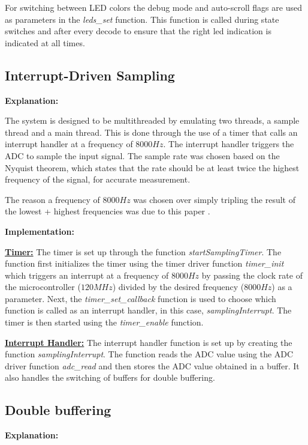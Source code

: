 \documentclass{cce2014-design}
\begin{document}
For switching between LED colors the debug mode and auto-scroll flags are used as parameters in the \textit{leds\_set} function. This function is called during state switches and after every decode to ensure that the right led indication is indicated at all times.

\newpage

\subsection{Interrupt-Driven Sampling}
\textbf{Explanation:}

The system is designed to be multithreaded by emulating two threads, a sample thread and a main thread. This is done through the use of a timer that calls an interrupt handler at a frequency of $8000Hz$. The interrupt handler triggers the ADC to sample the input signal. The sample rate was chosen based on the Nyquist theorem, which states that the rate should be at least twice the highest frequency of the signal, for accurate measurement.

The reason a frequency of $8000Hz$ was chosen over simply tripling the result of the lowest + highest frequencies was due to this paper \cite{DTMF_Frequency_Choice}.

\vspace{1em}
\textbf{Implementation:}

\textbf{\underline{Timer:}} The timer is set up through the function \textit{startSamplingTimer}. The function first initializes the timer using the timer driver function \textit{timer\_init} which triggers an interrupt at a frequency of $8000Hz$ by passing the clock rate of the microcontroller ($120MHz$) divided by the desired frequency ($8000Hz$) as a parameter. Next, the \textit{timer\_set\_callback} function is used to choose which function is called as an interrupt handler, in this case, \textit{samplingInterrupt}. The timer is then started using the \textit{timer\_enable} function.

\vspace{0.5em}

\textbf{\underline{Interrupt Handler:}} The interrupt handler function is set up by creating the function \textit{samplingInterrupt}. The function reads the ADC value using the ADC driver function \textit{adc\_read} and then stores the ADC value obtained in a buffer. It also handles the switching of buffers for double buffering.

\subsection{Double buffering}
\textbf{Explanation:}
\end{document}
